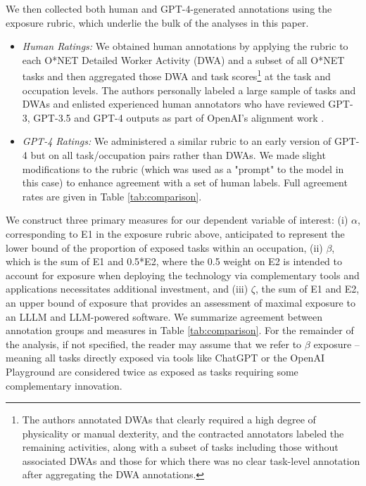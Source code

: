 \documentclass[11pt]{article}
\begin{document}
We then collected both human and GPT-4-generated annotations using the exposure rubric, which underlie the bulk of the analyses in this paper.
\begin{itemize}
    \item \textit{Human Ratings:} We obtained human annotations by applying the rubric to each O*NET Detailed Worker Activity (DWA) and a subset of all O*NET tasks and then aggregated those DWA and task scores\footnote{The authors annotated DWAs that clearly required a high degree of physicality or manual dexterity, and the contracted annotators labeled the remaining activities, along with a subset of tasks including those without associated DWAs and those for which there was no clear task-level annotation after aggregating the DWA annotations.} at the task and occupation levels. The authors personally labeled a large sample of tasks and DWAs and enlisted experienced human annotators who have reviewed GPT-3, GPT-3.5 and GPT-4 outputs as part of OpenAI's alignment work \citep{ouyang2022training}.
    \item \textit{GPT-4 Ratings:} We administered a similar rubric to an early version of GPT-4 \citep{gpt4} but on all task/occupation pairs rather than DWAs. We made slight modifications to the rubric (which was used as a "prompt" to the model in this case) to enhance agreement with a set of human labels. Full agreement rates are given in Table \ref{tab:comparison}.
\end{itemize}


We construct three primary measures for our dependent variable of interest: (i) \textbf{$\alpha$}, corresponding to E1 in the exposure rubric above, anticipated to represent the lower bound of the proportion of exposed tasks within an occupation, (ii) \textbf{$\beta$}, which is the sum of E1 and 0.5*E2, where the 0.5 weight on E2 is intended to account for exposure when deploying the technology via complementary tools and applications necessitates additional investment, and (iii) \textbf{$\zeta$}, the sum of E1 and E2, an upper bound of exposure that provides an assessment of maximal exposure to an LLLM and LLM-powered software. We summarize agreement between annotation groups and measures in Table \ref{tab:comparison}. For the remainder of the analysis, if not specified, the reader may assume that we refer to $\beta$ exposure -- meaning all tasks directly exposed via tools like ChatGPT or the OpenAI Playground are considered twice as exposed as tasks requiring some complementary innovation.
\end{document}

